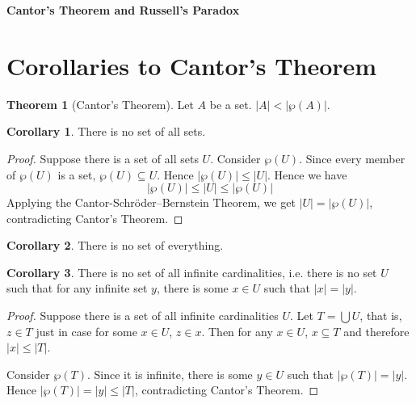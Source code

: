 \documentclass[11pt]{article}
\theoremstyle{definition}
\newtheorem{theorem}{Theorem}[section]
\newtheorem{corollary}{Corollary}[theorem]
\begin{document}




\begin{center}
{\LARGE \bf Cantor's Theorem and Russell's Paradox}
\end{center}

\smallskip

\section{Corollaries to Cantor's Theorem}

\begin{theorem} [Cantor's Theorem]
Let $A$ be a set. $|A| < |\wp(A)|$.
\end{theorem}

\begin{corollary} \label{Corollary 1.1.1}
There is no set of all sets.
\end{corollary}
\begin{proof}
Suppose there is a set of all sets $U$. Consider $\wp(U)$. Since every member of $\wp(U)$ is a set, $\wp(U) \subseteq U $. Hence $|\wp(U)| \leqslant |U|$. Hence we have
$$ |\wp(U)| \leqslant |U| \leqslant |\wp(U)| $$
Applying the Cantor-Schr\"{o}der–Bernstein Theorem, we get $|U|=|\wp(U)|$, contradicting Cantor's Theorem.
\end{proof}

\begin{corollary}
There is no set of everything.
\end{corollary}

\begin{corollary}
There is no set of all infinite cardinalities, i.e. there is no set $U$ such that for any infinite set $y$, there is some $x \in U$ such that $|x| = |y|$.
\end{corollary}

\begin{proof}
Suppose there is a set of all infinite cardinalities $U$. Let $T = \bigcup U$, that is, $z \in T$ just in case for some $x \in U$, $z \in x$. Then for any $x \in U$, $x \subseteq T$ and therefore $|x| \leqslant |T|$.

Consider $\wp(T)$. Since it is infinite, there is some $y \in U$ such that $|\wp(T)| = |y|$. Hence $|\wp(T)| = |y| \leqslant |T|$, contradicting Cantor's Theorem.
\end{proof}
\end{document}
